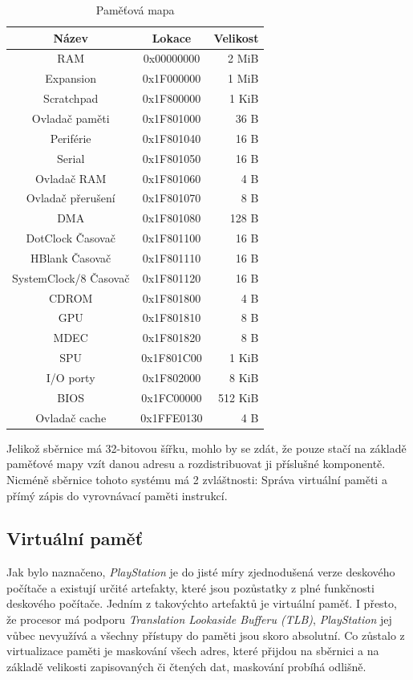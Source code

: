 \begin{table}[htbp]
\caption{Paměťová mapa}
\begin{center}
\begin{tabular}{ |c|c|r| }
 \hline
 \textbf{Název} & \textbf{Lokace} & \textbf{Velikost} \\
 \hline
 RAM & 0x00000000 & 2 MiB \\
 Expansion & 0x1F000000 & 1 MiB \\
 Scratchpad & 0x1F800000 & 1 KiB \\
 Ovladač paměti & 0x1F801000 & 36 B \\
 Periférie & 0x1F801040 & 16 B \\
 Serial & 0x1F801050 & 16 B \\
 Ovladač RAM & 0x1F801060 & 4 B \\
 Ovladač přerušení & 0x1F801070 & 8 B \\
 DMA & 0x1F801080 & 128 B \\
 DotClock Časovač & 0x1F801100 & 16 B \\
 HBlank Časovač & 0x1F801110 & 16 B \\
 SystemClock/8 Časovač & 0x1F801120 & 16 B \\
 CDROM & 0x1F801800 & 4 B \\
 GPU & 0x1F801810 & 8 B \\
 MDEC & 0x1F801820 & 8 B \\
 SPU & 0x1F801C00 & 1 KiB \\
 I/O porty & 0x1F802000 & 8 KiB \\
 BIOS & 0x1FC00000 & 512 KiB \\
 Ovladač cache & 0x1FFE0130 & 4 B \\
 \hline
\end{tabular}
\end{center}
\end{table}

Jelikož sběrnice má 32-bitovou šířku, mohlo by se zdát, že pouze stačí na základě paměťové mapy
vzít danou adresu a rozdistribuovat ji příslušné komponentě. Nicméně sběrnice tohoto systému má
2 zvláštnosti: Správa virtuální paměti a přímý zápis do vyrovnávací paměti instrukcí.

\subsection{Virtuální paměť}

Jak bylo naznačeno, \textit{PlayStation} je do jisté míry zjednodušená verze deskového počítače
a existují určité artefakty, které jsou pozůstatky z plné funkčnosti deskového počítače. Jedním z takovýchto
artefaktů je virtuální paměť. I přesto, že procesor má podporu \textit{Translation Lookaside Bufferu (TLB)},
\textit{PlayStation} jej vůbec nevyužívá a všechny přístupy do paměti jsou skoro absolutní.
Co zůstalo z virtualizace paměti je maskování všech adres, které přijdou na sběrnici a na základě
velikosti zapisovaných či čtených dat, maskování probíhá odlišně.

